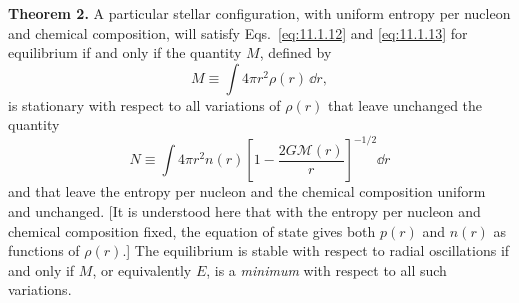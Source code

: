 \medskip
\noindent\textbf{Theorem 2.}
A particular stellar configuration, with uniform entropy per nucleon and
chemical composition, will satisfy Eqs.~\eqref{eq:11.1.12} and
\eqref{eq:11.1.13} for equilibrium if and only if the quantity \(M\), defined
by
\[
  M\equiv\int4\pi r^2\rho(r)\,\dd r,
\]
is stationary with respect to all variations of \(\rho(r)\) that leave
unchanged the quantity
\[
  N\equiv
  \int4\pi r^2n(r)
  \left[1-\frac{2G\mathcal{M}(r)}r\right]^{-1/2}\dd r
\]
and that leave the entropy per nucleon and the chemical composition uniform
and unchanged. [It is understood here that with the entropy per nucleon and
chemical composition fixed, the equation of state gives both \(p(r)\) and
\(n(r)\) as functions of \(\rho(r)\).] The equilibrium is stable with respect
to radial oscillations if and only if \(M\), or equivalently \(E\), is a
\emph{minimum} with respect to all such variations.
\medskip

